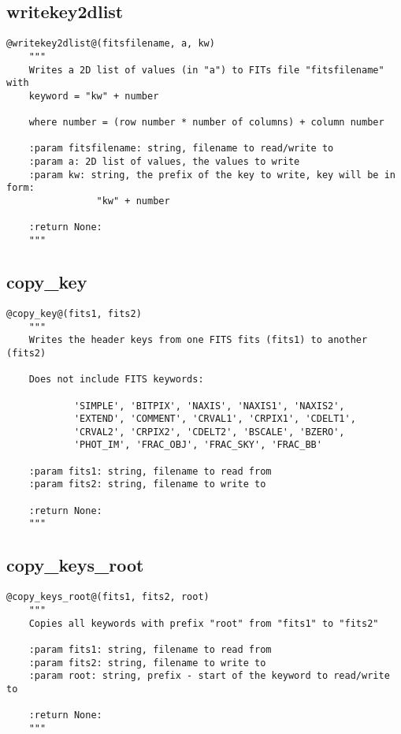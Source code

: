 \subsection{writekey2dlist}
\begin{lstlisting}[style=pythonstyle]
@writekey2dlist@(fitsfilename, a, kw)
    """
    Writes a 2D list of values (in "a") to FITs file "fitsfilename" with
    keyword = "kw" + number

    where number = (row number * number of columns) + column number

    :param fitsfilename: string, filename to read/write to
    :param a: 2D list of values, the values to write
    :param kw: string, the prefix of the key to write, key will be in form:
                "kw" + number

    :return None:
    """
\end{lstlisting}

\vspace{0.5cm}
\subsection{copy\_key}
\begin{lstlisting}[style=pythonstyle]
@copy_key@(fits1, fits2)
    """
    Writes the header keys from one FITS fits (fits1) to another (fits2)
    
    Does not include FITS keywords:
    
            'SIMPLE', 'BITPIX', 'NAXIS', 'NAXIS1', 'NAXIS2',
            'EXTEND', 'COMMENT', 'CRVAL1', 'CRPIX1', 'CDELT1',
            'CRVAL2', 'CRPIX2', 'CDELT2', 'BSCALE', 'BZERO',
            'PHOT_IM', 'FRAC_OBJ', 'FRAC_SKY', 'FRAC_BB'
    
    :param fits1: string, filename to read from 
    :param fits2: string, filename to write to
    
    :return None: 
    """
\end{lstlisting}

\vspace{0.5cm}
\subsection{copy\_keys\_root}
\begin{lstlisting}[style=pythonstyle]
@copy_keys_root@(fits1, fits2, root)
    """
    Copies all keywords with prefix "root" from "fits1" to "fits2"
    
    :param fits1: string, filename to read from
    :param fits2: string, filename to write to
    :param root: string, prefix - start of the keyword to read/write to
    
    :return None: 
    """
\end{lstlisting}

